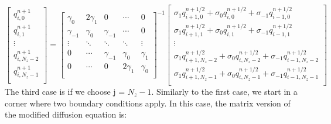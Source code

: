 \documentclass[11pt]{article} %
\begin{document}
\[  \begin{bmatrix}
q_{i,0}^{n+1} \\[0.5em]
q_{i,1}^{n+1} \\[0.5em]
\vdots \\[0.5em]
q_{i,N_z-2}^{n+1} \\[0.5em]
q_{i,N_z-1}^{n+1} \\[0.5em]
\end{bmatrix} = 
%
\begin{bmatrix}
\gamma_0 & 2\gamma_1 & 0 & \cdots & 0 \\[0.5em]
\gamma_{-1} & \gamma_0 & \gamma_{-1} &\cdots &0 \\[0.5em]
\vdots & \ddots & \ddots & \ddots & \vdots \\[0.5em]
0 & \cdots & \gamma_{-1} & \gamma_0 & \gamma_1  \\[0.5em]
0 & \cdots & 0 & 2\gamma_1 & \gamma_0 \\[0.5em]
\end{bmatrix}^{-1} 
%
\begin{bmatrix}
\sigma_1q_{i+1,0}^{n+1/2}+ \sigma_0q_{i,0}^{n+1/2} +\sigma_{-1}q_{i-1,0}^{n+1/2} \\[0.5em]
\sigma_1q_{i+1,1}^{n+1/2}+ \sigma_0q_{i,1}^{n+1/2} +\sigma_{-1}q_{i-1,1}^{n+1/2}  \\[0.5em]
\vdots \\[0.5em]
\sigma_1q_{i+1,N_z-2}^{n+1/2}+ \sigma_0q_{i,N_z-2}^{n+1/2} +\sigma_{-1}q_{i-1,N_z-2}^{n+1/2}  \\[0.5em]
\sigma_1q_{i+1,N_z-1}^{n+1/2}+ \sigma_0q_{i,N_z-1}^{n+1/2} +\sigma_{-1}q_{i-1,N_z-1}^{n+1/2}  \\[0.5em]
\end{bmatrix}
\]
\noindent
The third case is if we choose j  = $N_z-1$. Similarly to the first case, we start in a corner where two boundary conditions apply. In this case, the matrix version of the modified diffusion equation is:
\end{document}
